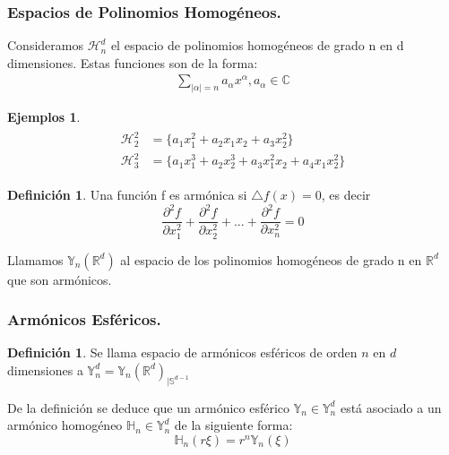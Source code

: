 \documentclass{beamer}
\theoremstyle{plain}
\theoremstyle{definition}
\newtheorem{defn}[thm]{Definici\'{o}n}
\theoremstyle{plain}
\theoremstyle{definition}
\theoremstyle{remark}
\theoremstyle{definition}
\newtheorem{ejemplos}[thm]{Ejemplos}
\begin{document}
\begin{frame}
	\frametitle{Espacios de Polinomios Homogéneos.}
	Consideramos $\mathcal{H}^d_n$ el espacio de polinomios homogéneos de grado n en d dimensiones.
	Estas funciones son de la forma:
	\begin{gather*}
		\sum_{|\alpha|=n}a_\alpha x^\alpha, a_\alpha \in \mathds{C}
	\end{gather*}

	\begin{ejemplos}
		\begin{gather*}
		\begin{aligned}
		\mathcal{H}^2_2 &= \{ a_1x_1^2 + a_2x_1x_2 + a_3x_2^2\} \\
		\mathcal{H}^2_3 &= \{ a_1x_1^3 + a_2x_2^3 + a_3x_1^2x_2 + a_4x_1x_2^2 \}
		\end{aligned}
		\end{gather*}
	\end{ejemplos}
\end{frame}

\begin{frame}
	\begin{defn}
		Una función f es armónica si $\triangle f (x) = 0$, es decir $$\frac{\partial^2 f}{\partial x_1^2}+\frac{\partial^2 f}{\partial x_2^2}+...+\frac{\partial^2 f}{\partial x_n^2} = 0$$
	\end{defn}

	Llamamos $\mathds{Y}_n(\mathds{R}^d)$ al espacio de los polinomios homogéneos de grado n en $\mathds{R}^d$ que son armónicos.

\end{frame}
\begin{frame}
	\frametitle{Armónicos Esféricos.}
	\begin{defn}
		Se llama espacio de armónicos esféricos de orden $n$ en $d$ dimensiones a	$\mathds{Y}^d_n = \mathds{Y}_n(\mathds{R}^d)_{|\mathds{S}^{d-1}}$ 
	\end{defn}
	De la definición se deduce que un armónico esférico $\mathds{Y}_n \in \mathds{Y}^d_n$ está asociado a un armónico homogéneo $\mathds{H}_n \in \mathds{Y}^d_n$ de la siguiente forma:
	$$
	\mathds{H}_n(r\xi) = r^n\mathds{Y}_n(\xi)
	$$
\end{frame}
\end{document}
